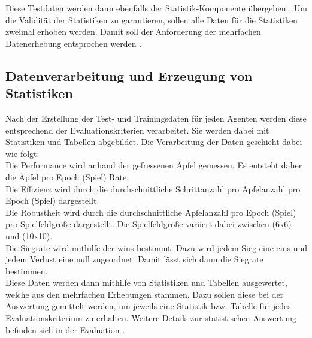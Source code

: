 Diese Testdaten werden dann ebenfalls der Statistik-Komponente übergeben .
Um die Validität der Statistiken zu garantieren, sollen alle Daten für die Statistiken zweimal erhoben werden. Damit soll der Anforderung der mehrfachen Datenerhebung entsprochen werden . 

\subsection{Datenverarbeitung und Erzeugung von Statistiken} \label{subsec:Konzept_Datenverarbeitung}
Nach der Erstellung der Test- und Trainingsdaten für jeden Agenten werden diese entsprechend der Evaluationskriterien  verarbeitet. Sie werden dabei mit Statistiken und Tabellen abgebildet.
Die Verarbeitung der Daten geschieht dabei wie folgt:\\
Die Performance wird anhand der gefressenen Äpfel gemessen. Es entsteht daher die Äpfel pro Epoch (Spiel) Rate.\\
Die Effizienz wird durch die durchschnittliche Schrittanzahl pro Apfelanzahl pro Epoch (Spiel) dargestellt.\\
Die Robustheit wird durch die durchschnittliche Apfelanzahl pro Epoch (Spiel) pro Spielfeldgröße dargestellt.
Die Spielfeldgröße variiert dabei zwischen (6x6) und (10x10).\\
Die Siegrate wird mithilfe der wins bestimmt. Dazu wird jedem Sieg eine eins und jedem Verlust eine null zugeordnet. Damit lässt sich dann die Siegrate bestimmen.\\
Diese Daten werden dann mithilfe von Statistiken und Tabellen ausgewertet, welche aus den mehrfachen Erhebungen stammen. Dazu sollen diese bei der Auswertung gemittelt werden, um jeweils eine Statistik bzw. Tabelle für jedes Evaluationskriterium zu erhalten. 
Weitere Details zur statistischen Auswertung befinden sich in der Evaluation .

